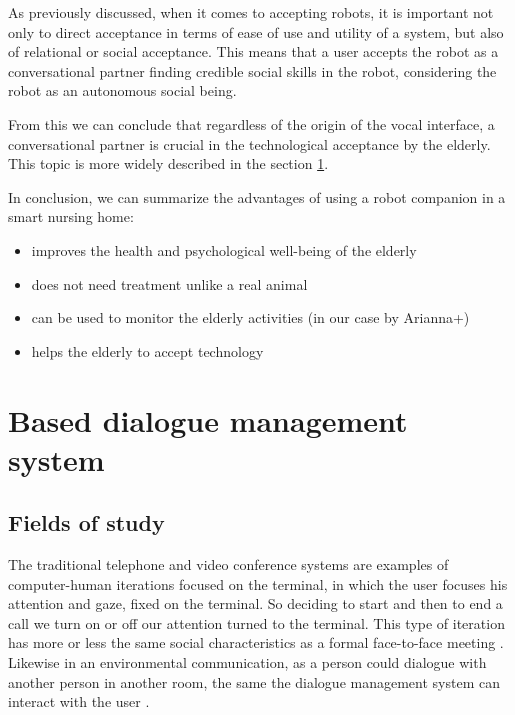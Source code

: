 \documentclass{thesisreport}
\begin{document}
 As previously discussed, when it comes to accepting robots, it is important not only to direct acceptance in terms of ease of use and utility of a system, but also of relational or social acceptance. This means that a user accepts the robot as a conversational partner finding credible social skills in the robot, considering the robot as an autonomous social being. 
 
 From this we can conclude that regardless of the origin of the vocal interface, a conversational partner is crucial in the technological acceptance by the elderly. This topic is more widely described in the section \ref{speech}.
 
 In conclusion, we can summarize the advantages of using a robot companion in a smart nursing home:
 \begin{itemize}
     \item improves the health and psychological well-being of the elderly
     \item does not need treatment unlike a real animal
     \item can be used to monitor the elderly activities (in our case by Arianna+)
     \item helps the elderly to accept technology
 \end{itemize}

 \section{Based dialogue management system} \label{speech}
 \subsection{Fields of study}
 The traditional telephone and video conference systems are examples of computer-human iterations focused on the terminal, in which the user focuses his attention and gaze, fixed on the terminal. So deciding to start and then to end a call we turn on or off our attention turned to the terminal. This type of iteration has more or less the same social characteristics as a formal face-to-face meeting \cite{augusto2010ambient}.
 Likewise in an environmental communication, as a person could dialogue with another person in another room, the same the dialogue management system can interact with the  user .
 
\end{document}
